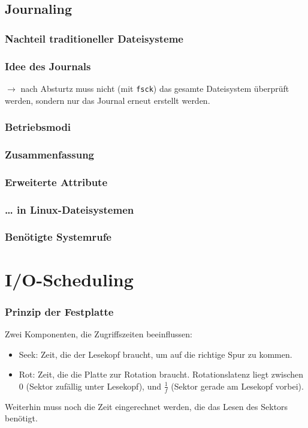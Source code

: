 \subsection{Journaling}
\subsubsection{Nachteil traditioneller Dateisysteme}
\subsubsection{Idee des Journals}
$\to$ nach Absturtz muss nicht (mit \lstinline`fsck`) das gesamte Dateisystem überprüft werden, sondern nur das Journal erneut erstellt werden.
\subsubsection{Betriebsmodi}
\subsubsection{Zusammenfassung}
\subsubsection{Erweiterte Attribute}
\subsubsection*{… in Linux-Dateisystemen}
\subsubsection*{Benötigte Systemrufe}

\section{I/O-Scheduling}
\subsubsection*{Prinzip der Festplatte}
Zwei Komponenten, die Zugriffszeiten beeinflussen:
\begin{itemize}
\item Seek: Zeit, die der Lesekopf braucht, um auf die richtige Spur zu kommen.
\item Rot: Zeit, die die Platte zur Rotation braucht. Rotationslatenz liegt zwischen $0$ (Sektor zufällig unter Lesekopf), und $\frac{1}{f}$ (Sektor gerade am Lesekopf vorbei).
\end{itemize}
Weiterhin muss noch die Zeit eingerechnet werden, die das Lesen des Sektors benötigt.

